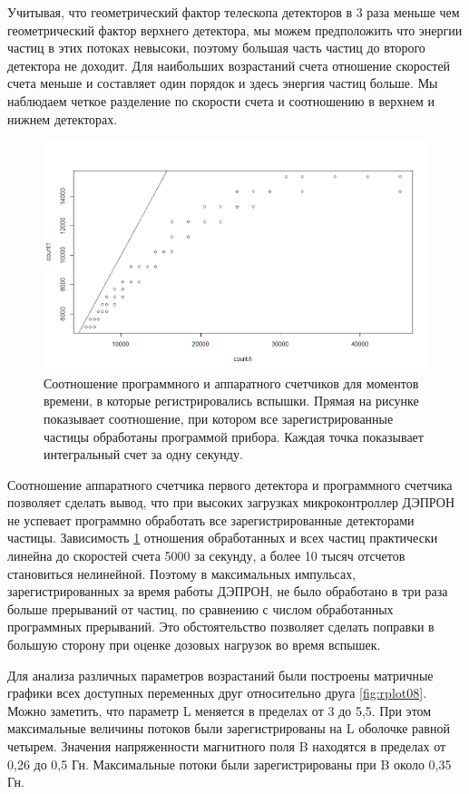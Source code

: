 Учитывая, что геометрический фактор телескопа детекторов в 3 раза меньше чем геометрический фактор верхнего детектора, мы можем предположить что энергии частиц в этих потоках невысоки, поэтому большая часть частиц до второго детектора не доходит.	Для наибольших возрастаний счета отношение скоростей счета меньше и составляет один порядок и здесь энергия частиц больше. Мы наблюдаем четкое разделение по скорости счета и соотношению в верхнем и нижнем детекторах. 
\begin{figure}[h]
	\centering
	\includegraphics[width=0.7\linewidth]{images/Flash/Rplot04}
	\caption{Соотношение программного и аппаратного счетчиков для моментов времени, в которые регистрировались вспышки. Прямая на рисунке показывает соотношение, при котором все зарегистрированные частицы обработаны программой прибора. Каждая точка показывает интегральный счет за одну секунду.}
	\label{fig:rplot04}
\end{figure}
Соотношение аппаратного счетчика первого детектора и программного счетчика позволяет сделать вывод, что при высоких загрузках микроконтроллер ДЭПРОН не успевает программно обработать все зарегистрированные детекторами частицы. Зависимость \ref{fig:rplot04} отношения обработанных и всех частиц практически линейна до скоростей счета 5000 за секунду, а более 10 тысяч отсчетов становиться нелинейной. Поэтому в максимальных импульсах, зарегистрированных за время работы ДЭПРОН, не было обработано в три раза больше прерываний от частиц, по сравнению с числом обработанных программных прерываний. Это обстоятельство позволяет сделать поправки в большую сторону при оценке дозовых нагрузок во время вспышек. 

Для анализа различных параметров возрастаний были построены матричные графики всех доступных переменных друг относительно друга 	\ref{fig:rplot08}. Можно заметить, что параметр L меняется в пределах от 3 до 5,5. При этом максимальные величины потоков были зарегистрированы на L оболочке равной четырем. Значения напряженности магнитного поля B находятся в пределах от 0,26 до 0,5 Гн. Максимальные потоки были зарегистрированы при B около 0,35 Гн. 

